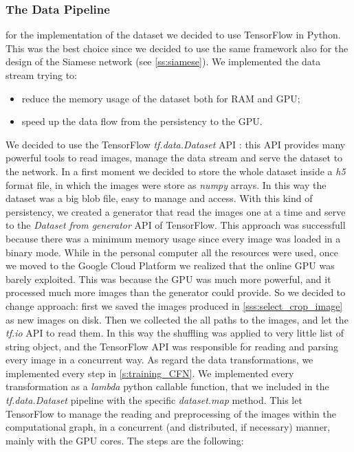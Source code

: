 \subsubsection{The Data Pipeline}
for the implementation of the dataset we decided to use TensorFlow in Python. This was the best choice since we decided to use the same framework also for the design of the Siamese network (see \ref{ss:siamese}). We implemented the data stream trying to:
\begin{itemize}
    \item reduce the memory usage of the dataset both for RAM and GPU;
    \item speed up the data flow from the persistency to the GPU.
\end{itemize}
We decided to use the TensorFlow \emph{tf.data.Dataset} API \cite{tf_data_dataset}: this API provides many powerful tools to read images, manage the data stream and serve the dataset to the network.
In a first moment we decided to store the whole dataset inside a \emph{h5} format file, in which the images were store as \emph{numpy} arrays. In this way the dataset was a big blob file, easy to manage and access. With this kind of persistency, we created a generator that read the images one at a time and serve to the \emph{Dataset from generator} API of TensorFlow. This approach was successfull because there was a minimum memory usage since every image was loaded in a binary mode. While in the personal computer all the resources were used, once we moved to the Google Cloud Platform we realized that the online GPU was barely exploited. This was because the GPU was much more powerful, and it processed much more images than the generator could provide. 
So we decided to change approach: first we saved the images produced in \ref{sss:select_crop_image} as new images on disk. Then we collected the all paths to the images, and let the \emph{tf.io} API to read them. In this way the shuffling was applied to very little list of string object, and the TensorFlow API was responsible for reading and parsing every image in a concurrent way.\newline
As regard the data transformations, we implemented every step in \ref{s:training_CFN}. We implemented every transformation as a \emph{lambda} python callable function, that we included in the \emph{tf.data.Dataset} pipeline with the specific \emph{dataset.map} method. This let TensorFlow to manage the reading and preprocessing of the images within the computational graph, in a concurrent (and distributed, if necessary) manner, mainly with the GPU cores. The steps are the following:
